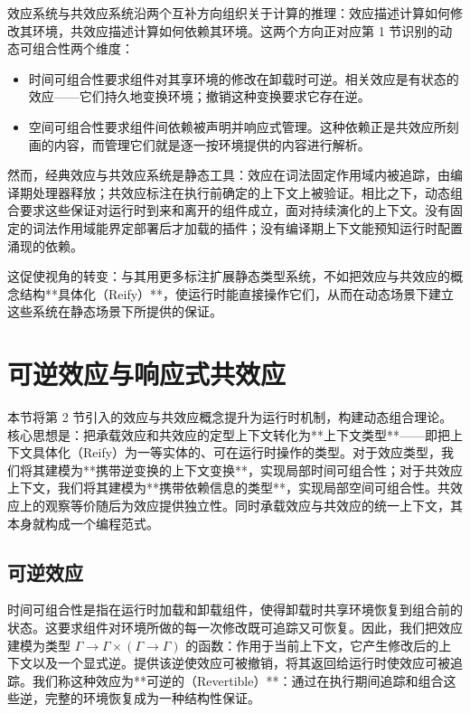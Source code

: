 \documentclass[11pt,a4paper]{article}
\theoremstyle{plain}
\theoremstyle{definition}
\theoremstyle{remark}
\begin{document}
效应系统与共效应系统沿两个互补方向组织关于计算的推理：效应描述计算如何修改其环境，共效应描述计算如何依赖其环境。这两个方向正对应第 1 节识别的动态可组合性两个维度：

\begin{itemize}
\item 时间可组合性要求组件对其享环境的修改在卸载时可逆。相关效应是有状态的效应——它们持久地变换环境；撤销这种变换要求它存在逆。
\item 空间可组合性要求组件间依赖被声明并响应式管理。这种依赖正是共效应所刻画的内容，而管理它们就是逐一按环境提供的内容进行解析。
\end{itemize}

然而，经典效应与共效应系统是静态工具：效应在词法固定作用域内被追踪，由编译期处理器释放；共效应标注在执行前确定的上下文上被验证。相比之下，动态组合要求这些保证对运行时到来和离开的组件成立，面对持续演化的上下文。没有固定的词法作用域能界定部署后才加载的插件；没有编译期上下文能预知运行时配置涌现的依赖。

这促使视角的转变：与其用更多标注扩展静态类型系统，不如把效应与共效应的概念结构**具体化（Reify）**，使运行时能直接操作它们，从而在动态场景下建立这些系统在静态场景下所提供的保证。
\section{可逆效应与响应式共效应}

本节将第 2 节引入的效应与共效应概念提升为运行时机制，构建动态组合理论。核心思想是：把承载效应和共效应的定型上下文转化为**上下文类型**——即把上下文具体化（Reify）为一等实体的、可在运行时操作的类型。对于效应类型，我们将其建模为**携带逆变换的上下文变换**，实现局部时间可组合性；对于共效应上下文，我们将其建模为**携带依赖信息的类型**，实现局部空间可组合性。共效应上的观察等价随后为效应提供独立性。同时承载效应与共效应的统一上下文，其本身就构成一个编程范式。

\subsection{可逆效应}

时间可组合性是指在运行时加载和卸载组件，使得卸载时共享环境恢复到组合前的状态。这要求组件对环境所做的每一次修改既可追踪又可恢复。因此，我们把效应建模为类型 $\Gamma \to \Gamma \times (\Gamma \to \Gamma)$ 的函数：作用于当前上下文，它产生修改后的上下文以及一个显式逆。提供该逆使效应可被撤销，将其返回给运行时使效应可被追踪。我们称这种效应为**可逆的（Revertible）**：通过在执行期间追踪和组合这些逆，完整的环境恢复成为一种结构性保证。
\end{document}
